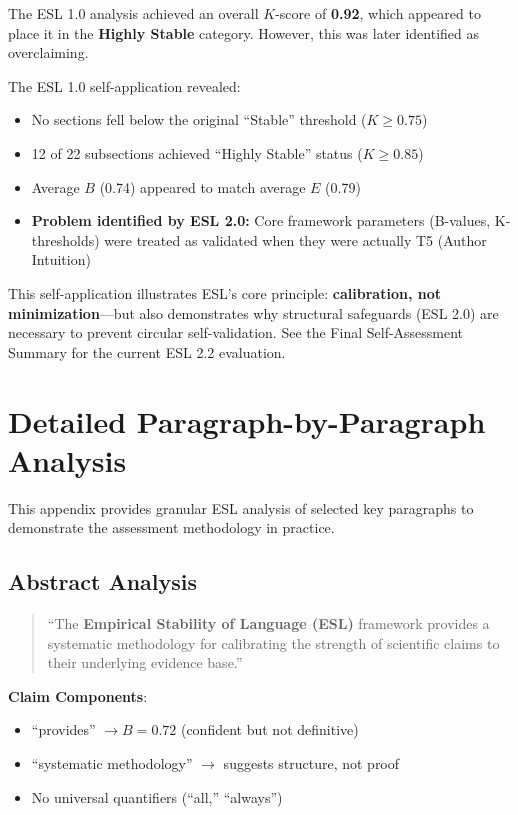 \documentclass[11pt,a4paper]{article}
\begin{document}
The ESL 1.0 analysis achieved an overall $K$-score of \textbf{0.92}, which appeared to place it in the \textbf{Highly Stable} category. However, this was later identified as overclaiming.

The ESL 1.0 self-application revealed:
\begin{itemize}
    \item No sections fell below the original ``Stable'' threshold ($K \geq 0.75$)
    \item 12 of 22 subsections achieved ``Highly Stable'' status ($K \geq 0.85$)
    \item Average $B$ (0.74) appeared to match average $E$ (0.79)
    \item \textbf{Problem identified by ESL 2.0:} Core framework parameters (B-values, K-thresholds) were treated as validated when they were actually T5 (Author Intuition)
\end{itemize}

This self-application illustrates ESL's core principle: \textbf{calibration, not minimization}---but also demonstrates why structural safeguards (ESL 2.0) are necessary to prevent circular self-validation. See the Final Self-Assessment Summary for the current ESL 2.2 evaluation.


\section{Detailed Paragraph-by-Paragraph Analysis}
\label{app:paragraph}

This appendix provides granular ESL analysis of selected key paragraphs to demonstrate the assessment methodology in practice.

\subsection{Abstract Analysis}

\begin{quote}
``The \textbf{Empirical Stability of Language (ESL)} framework provides a systematic methodology for calibrating the strength of scientific claims to their underlying evidence base.''
\end{quote}

\textbf{Claim Components}:
\begin{itemize}
    \item ``provides'' $\to B = 0.72$ (confident but not definitive)
    \item ``systematic methodology'' $\to$ suggests structure, not proof
    \item No universal quantifiers (``all,'' ``always'')
\end{itemize}
\end{document}
